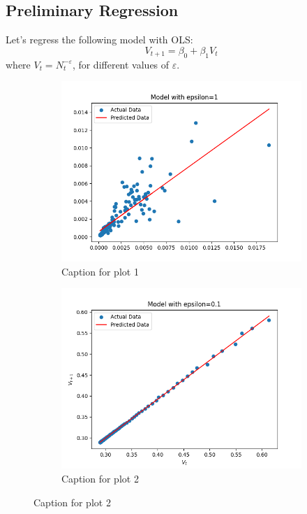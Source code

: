     \subsection{Preliminary Regression}
    Let's regress the following model with OLS:
    \begin{equation}
        V_{t+1} = \beta_0 + \beta_1 V_t
    \end{equation}
    where $V_t=N_t^{-\varepsilon}$, for different values of $\varepsilon$.

    \begin{figure}[h!]
        \centering
        \begin{subfigure}[b]{0.3\textwidth}
            \includegraphics[width=.8\linewidth]{plots/epsilon_1}
            \caption{Caption for plot 1}
        \end{subfigure} \quad
        \begin{subfigure}[b]{0.3\textwidth}
            \includegraphics[width=.8\linewidth]{plots/epsilon_0.1}
            \caption{Caption for plot 2}
        \end{subfigure} \quad

\end{figure}
